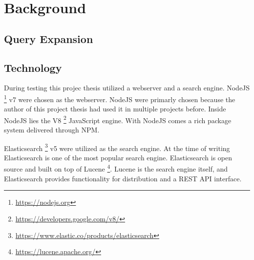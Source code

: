 \chapter{Background}
\section{Query Expansion}

\section{Technology}
During testing this projec thesis utilized a webserver and a search engine.
NodeJS \footnote{\url{https://nodejs.org}} v7 were chosen as the webserver.
NodeJS were primarly chosen because the author of this project thesis had used it in multiple projects before.
Inside NodeJS lies the V8 \footnote{\url{https://developers.google.com/v8/}} JavaScript engine.
With NodeJS comes a rich package system delivered through NPM.

Elasticsearch \footnote{\url{https://www.elastic.co/products/elasticsearch}} v5 were utilized as the search engine.
At the time of writing Elasticsearch is one of the most popular search engine.
Elasticsearch is open source and built on top of Lucene \footnote{\url{https://lucene.apache.org/}}.
Lucene is the search engine itself,
and Elasticsearch provides functionality for distribution and a REST API interface.
